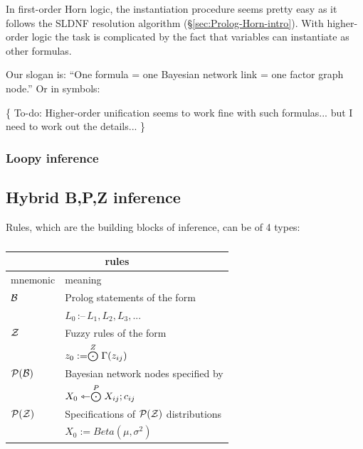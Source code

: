 In first-order Horn logic, the instantiation procedure seems pretty easy as it follows the SLDNF resolution algorithm (\S\ref{sec:Prolog-Horn-intro}).  With higher-order logic the task is complicated by the fact that variables can instantiate as other formulas.

Our slogan is:  ``One formula = one Bayesian network link = one factor graph node.''  Or in symbols:

\vspace{0.1cm} \tab \tab
{}

\{ To-do:  Higher-order unification seems to work fine with such formulas... but I need to work out the details...  \}

\underconst

\subsubsection{Loopy inference}

\underconst

\subsection{Hybrid B,P,Z inference}

Rules, which are the building blocks of inference, can be of 4 types:

\begin{table}[H]
\parbox{3cm}{\caption{}}
\begin{tabular}{|l|l|} \hline
\multicolumn{2}{|c|}{\textbf{rules}}\\ \hline
mnemonic             & meaning\\ \hline
$\mathcal{B}$              & Prolog statements of the form\\
                     & \qquad $L_0 \, \mbox{:--} \, L_1, L_2, L_3, ... $ \\
$\mathcal{Z}$              & Fuzzy rules of the form\\
                     & \qquad $z_0 := \stackrel{Z}{\bigodot} \Gamma(z_{ij})$ \\
$\mathcal{P(B)}$             & Bayesian network nodes specified by\\
                     & \qquad $X_0 \leftarrowtriangle \stackrel{P}{\bigodot} X_{ij};c_{ij}$ \\
$\mathcal{P(Z)}$             & Specifications of $\mathcal{P(Z)}$ distributions\\
                     & \qquad $X_0 := Beta(\mu,\sigma^2)$ \\
\hline
\end{tabular}
\end{table}

